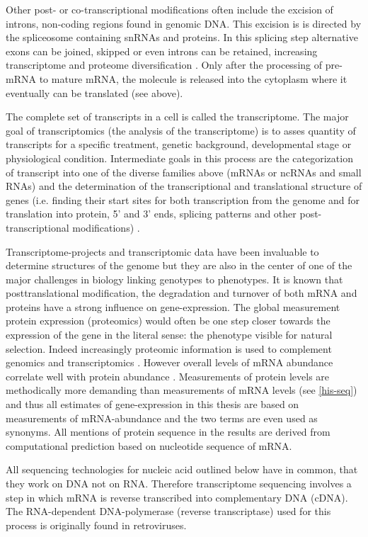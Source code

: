 Other post- or co-transcriptional modifications often include the
excision of introns, non-coding regions found in genomic DNA. This
excision is is directed by the spliceosome containing snRNAs and
proteins. In this splicing step alternative exons can be joined,
skipped or even introns can be retained, increasing transcriptome and
proteome diversification \cite{pmid17158149}. Only after the
processing of pre-mRNA to mature mRNA, the molecule is released into
the cytoplasm where it eventually can be translated (see above).

The complete set of transcripts in a cell is called the
transcriptome. The major goal of transcriptomics (the analysis of the
transcriptome) is to asses quantity of transcripts for a specific
treatment, genetic background, developmental stage or physiological
condition. Intermediate goals in this process are the categorization
of transcript into one of the diverse families above (mRNAs or ncRNAs
and small RNAs) and the determination of the transcriptional and
translational structure of genes (i.e. finding their start sites for
both transcription from the genome and for translation into protein,
5' and 3' ends, splicing patterns and other post-transcriptional
modifications) \cite{pmid19015660}.

Transcriptome-projects and transcriptomic data have been invaluable to
determine structures of the genome but they are also in the center of
one of the major challenges in biology linking genotypes to
phenotypes. It is known that posttranslational modification, the
degradation and turnover of both mRNA and proteins have a strong
influence on gene-expression. The global measurement protein expression
(proteomics) would often be one step closer towards the expression of
the gene in the literal sense: the phenotype visible for natural
selection. Indeed increasingly proteomic information is used to
complement genomics and transcriptomics \cite{pmid20121477}. However
overall levels of mRNA abundance correlate well with protein abundance
\cite{pmid21593866}. Measurements of protein levels are methodically
more demanding than measurements of mRNA levels (see \ref{his-seq}) and
thus all estimates of gene-expression in this thesis are based on
measurements of mRNA-abundance and the two terms are even used as
synonyms. All mentions of protein sequence in the results are derived
from computational prediction based on nucleotide sequence of mRNA.

All sequencing technologies for nucleic acid outlined below have in
common, that they work on DNA not on RNA. Therefore transcriptome
sequencing involves a step in which mRNA is reverse transcribed into
complementary DNA (cDNA). The RNA-dependent DNA-polymerase (reverse
transcriptase) used for this process is originally found in
retroviruses.

